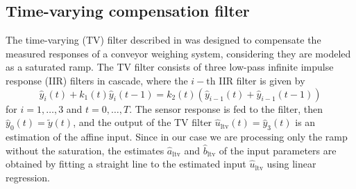 \subsection{Time-varying compensation filter}
The time-varying (TV) filter described in \citep{Pietrzak14} was designed to compensate the measured responses of a conveyor weighing system, considering they are modeled as a saturated ramp.
The TV filter consists of three low-pass infinite impulse response (IIR) filters in cascade, where the $i-\mathrm{th}$ IIR filter is given by
\begin{equation} \widehat{y}_i(t) + k_1(t) \widehat{y}_i(t-1) = k_2(t) \left( \widehat{y}_{i-1}(t) + \widehat{y}_{i-1}(t-1) \right) \end{equation}
for $i = 1,\ldots,3$ and $t=0,\ldots,T$.
The sensor response is fed to the filter, then $\widehat{y}_0(t) = \widetilde{y}(t)$, and the output of the TV filter $\widehat{u}_\mathrm{ltv}(t) = \widehat{y}_3(t)$ is an estimation of the affine input.
Since in our case we are processing only the ramp without the saturation, the estimates $\widehat{a}_\mathrm{ltv}$ and $\widehat{b}_\mathrm{ltv}$ of the input parameters are obtained by fitting a straight line to the estimated input $\widehat{u}_\mathrm{ltv}$ using linear regression.

